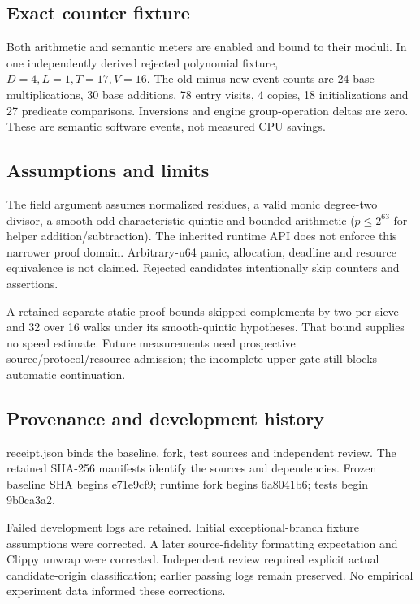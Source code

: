 \documentclass[11pt]{article}
\begin{document}
\subsection*{Exact counter fixture}
Both arithmetic and semantic meters are enabled and bound to their moduli. In one independently derived rejected polynomial fixture, $D=4,L=1,T=17,V=16$. The old-minus-new event counts are 24 base multiplications, 30 base additions, 78 entry visits, 4 copies, 18 initializations and 27 predicate comparisons. Inversions and engine group-operation deltas are zero. These are semantic software events, not measured CPU savings.
\subsection*{Assumptions and limits}
The field argument assumes normalized residues, a valid monic degree-two divisor, a smooth odd-characteristic quintic and bounded arithmetic ($p\leq2^{63}$ for helper addition/subtraction). The inherited runtime API does not enforce this narrower proof domain. Arbitrary-u64 panic, allocation, deadline and resource equivalence is not claimed. Rejected candidates intentionally skip counters and assertions.\par
A retained separate static proof bounds skipped complements by two per sieve and 32 over 16 walks under its smooth-quintic hypotheses. That bound supplies no speed estimate. Future measurements need prospective source/protocol/resource admission; the incomplete upper gate still blocks automatic continuation.
\subsection*{Provenance and development history}
receipt.json binds the baseline, fork, test sources and independent review. The retained SHA-256 manifests identify the sources and dependencies. Frozen baseline SHA begins e71e9cf9; runtime fork begins 6a8041b6; tests begin 9b0ca3a2.\par
Failed development logs are retained. Initial exceptional-branch fixture assumptions were corrected. A later source-fidelity formatting expectation and Clippy unwrap were corrected. Independent review required explicit actual candidate-origin classification; earlier passing logs remain preserved. No empirical experiment data informed these corrections.
\end{document}
